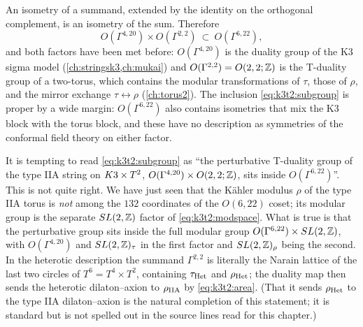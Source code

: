 An isometry of a summand, extended by the identity on the orthogonal complement, is an isometry
of the sum. Therefore
\begin{equation}\label{eq:k3t2:subgroup}
 O(\Gamma^{4,20})\times O(\Gamma^{2,2})\ \subset\ O(\Gamma^{6,22}),
\end{equation}
and both factors have been met before: $O(\Gamma^{4,20})$ is the duality group of the K3
sigma model (\cref{ch:stringsk3,ch:mukai}) and $O(\Gamma^{2,2})=O(2,2;\mathbb{Z})$ is the T-duality
group of a two-torus, which contains the modular transformations of $\tau$, those of $\rho$,
and the mirror exchange $\tau\leftrightarrow\rho$ (\cref{ch:torus2}). The inclusion \eqref{eq:k3t2:subgroup} is
proper by a wide margin: $O(\Gamma^{6,22})$ also contains isometries that mix the K3 block
with the torus block, and these have no description as symmetries of the conformal field
theory on either factor.

\begin{pitfallbox}
It is tempting to read \eqref{eq:k3t2:subgroup} as ``the perturbative T-duality group of
the type IIA string on $K3\times T^2$, $O(\Gamma^{4,20})\times O(2,2;\mathbb{Z})$, sits inside
$O(\Gamma^{6,22})$''. This is not quite right. We have just seen that the K\"ahler modulus
$\rho$ of the type IIA torus is \emph{not} among the $132$ coordinates of the $O(6,22)$
coset; its modular group is the separate $SL(2,\mathbb{Z})$ factor of \eqref{eq:k3t2:modspace}. What is
true is that the perturbative group sits inside the full modular group
$O(\Gamma^{6,22})\times SL(2,\mathbb{Z})$, with $O(\Gamma^{4,20})$ and $SL(2,\mathbb{Z})_\tau$ in the first factor and
$SL(2,\mathbb{Z})_\rho$ being the second. In the heterotic description the summand $\Gamma^{2,2}$ is
literally the Narain lattice of the last two circles of $T^6=T^4\times T^2$, containing
$\tau_{\rm Het}$ and $\rho_{\rm Het}$; the duality map then sends the heterotic
dilaton--axion to $\rho_{\rm IIA}$ by \eqref{eq:k3t2:area}. (That it sends
$\rho_{\rm Het}$ to the type IIA dilaton--axion is the natural completion of this statement;
it is standard but is not spelled out in the source lines read for this chapter.)
\end{pitfallbox}

